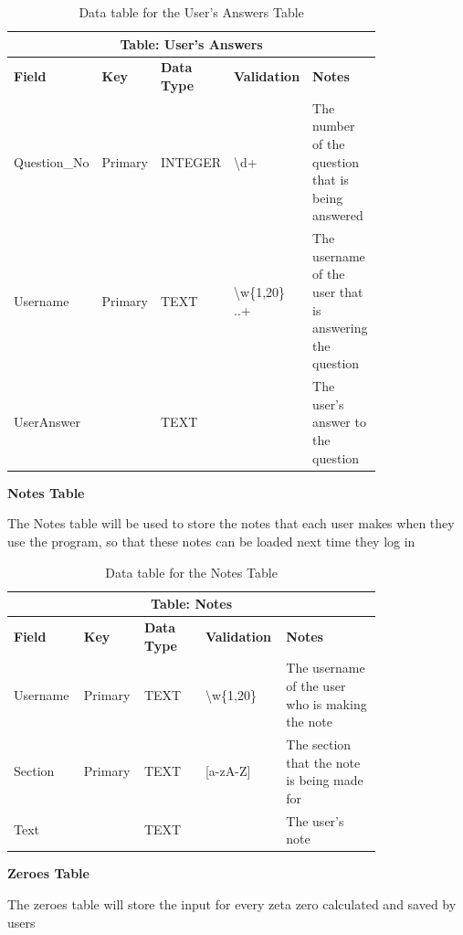 \documentclass{article}
\begin{document}
\begin{table}[ht]
    \centering
    \begin{tabular}{ | p{0.15\linewidth} | p{0.1\linewidth} | p{0.16\linewidth} | p{0.14\linewidth} | p{0.25\linewidth} | }
    \hline
    \multicolumn{5}{|c|}{\textbf{Table: User's Answers}}\\
    \hline
    \hline
    \textbf{Field} & \textbf{Key} & \textbf{Data Type} & \textbf{Validation} & \textbf{Notes} \\
    \hline
    Question\_No & Primary & INTEGER & \textbackslash d+ & The number of the question that is being answered\\
    \hline
    Username & Primary & TEXT & \textbackslash w\{1,20\} ..+ & The username of the user that is answering the question\\
    \hline
    UserAnswer & & TEXT & & The user's answer to the question\\
    \hline
    \end{tabular}
    \caption{Data table for the User's Answers Table}
\end{table}

\clearpage
\textbf{Notes Table}

The Notes table will be used to store the notes that each user makes when they use the program, so that these notes can be loaded next time they log in

\begin{table}[ht]
    \centering
    \begin{tabular}{ | p{0.15\linewidth} | p{0.1\linewidth} | p{0.16\linewidth} | p{0.14\linewidth} | p{0.25\linewidth} | }
    \hline
    \multicolumn{5}{|c|}{\textbf{Table: Notes}}\\
    \hline
    \hline
    \textbf{Field} & \textbf{Key} & \textbf{Data Type} & \textbf{Validation} & \textbf{Notes} \\
    \hline
    Username & Primary & TEXT & \textbackslash w\{1,20\} & The username of the user who is making the note\\
    \hline
    Section & Primary & TEXT & [a-zA-Z] & The section that the note is being made for\\
    \hline
    Text & & TEXT & & The user's note\\
    \hline
    \end{tabular}
    \caption{Data table for the Notes Table}
\end{table}

\textbf{Zeroes Table}

The zeroes table will store the input for every zeta zero calculated and saved by users
\end{document}
